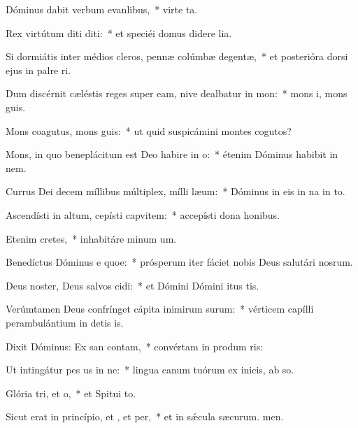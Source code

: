 \item Dóminus dabit verbum evanlibus,~* virte ta.
\item Rex virtútum diti diti:~* et speciéi domus didere lia.
\item Si dormiátis inter médios cleros, pennæ colúmbæ degentæ,~* et posterióra dorsi ejus in palre ri.
\item Dum discérnit cæléstis reges super eam, nive dealbatur in mon:~* mons i, mons guis.
\item Mons coagutus, mons guis:~* ut quid suspicámini montes cogutos?
\item Mons, in quo beneplácitum est Deo habire in o:~* étenim Dóminus habibit in nem.
\item Currus Dei decem míllibus múltiplex, mílli læum:~* Dóminus in eis in na in to.
\item Ascendísti in altum, cepísti capvitem:~* accepísti dona  honibus.
\item Etenim  cretes,~* inhabitáre minum um.
\item Benedíctus Dóminus e quoe:~* prósperum iter fáciet nobis Deus salutári nosrum.
\item Deus noster, Deus salvos cidi:~* et Dómini Dómini itus tis.
\item Verúmtamen Deus confrínget cápita inimirum surum:~* vérticem capílli perambulántium in detis is.
\item Dixit Dóminus: Ex san contam,~* convértam in produm ris:
\item Ut intingátur pes us in ne:~* lingua canum tuórum ex inicis, ab so.
\item Glória tri, et o,~* et Spitui to.
\item Sicut erat in princípio, et , et per,~* et in sǽcula sæcurum. men.
